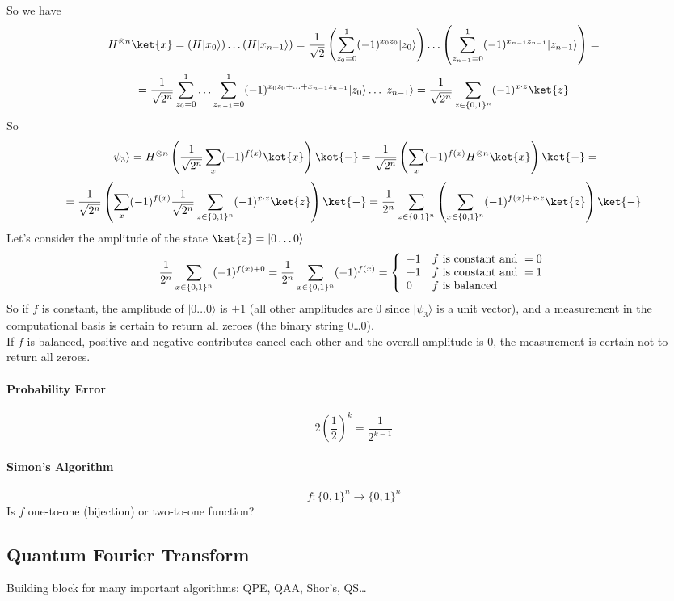 \documentclass[10pt]{report}
\begin{document}
So we have
$$H^{\otimes n}\ket{x} = (H|x_0\rangle)\ldots(H|x_{n-1}\rangle) = \frac{1}{\sqrt{2}}\left(\sum_{z_0=0}^1(-1)^{x_0z_0}|z_0\rangle\right)\ldots\left(\sum_{z_{n-1}=0}^1(-1)^{x_{n-1}z_{n-1}}|z_{n-1}\rangle\right)=$$
$$=\frac{1}{\sqrt{2^n}} \sum_{z_0=0}^1\ldots\sum_{z_{n-1}=0}^1 (-1)^{x_0z_0+\ldots+x_{n-1}z_{n-1}}|z_0\rangle\ldots|z_{n-1}\rangle = \frac{1}{\sqrt{2^n}}\sum_{z\in\{0,1\}^n} (-1)^{x\cdot z}\ket{z}$$
So
$$|\psi_3\rangle = H^{\otimes n}\left(\frac{1}{\sqrt{2^n}}\sum_x(-1)^{f(x)}\ket{x} \right)\ket{-} = \frac{1}{\sqrt{2^n}}\left(\sum_x (-1)^{f(x)}H^{\otimes n}\ket{x}\right)\ket{-} =$$ $$= \frac{1}{\sqrt{2^n}}\left( \sum_x (-1)^{f(x)}\frac{1}{\sqrt{2^n}}\sum_{z\in\{0,1\}^n}(-1)^{x\cdot z}\ket{z}\right)\ket{-} = \frac{1}{2^n}\sum_{z\in\{0,1\}^n}\left(\sum_{x\in\{0,1\}^n}(-1)^{f(x)+x\cdot z}\ket{z}\right)\ket{-}$$
Let's consider the amplitude of the state $\ket{z} = |0\ldots 0\rangle$
$$\frac{1}{2^n}\sum_{x\in\{0,1\}^n}(-1)^{f(x)+0} = \frac{1}{2^n}\sum_{x\in\{0,1\}^n}(-1)^{f(x)}=\left\{\begin{array}{l l}
-1&f\hbox{ is constant and }=0\\
+1&f\hbox{ is constant and }=1\\
0&f\hbox{ is balanced}\\
\end{array}\right.$$
So if $f$ is constant, the amplitude of $|0\ldots0\rangle$ is $\pm 1$ (all other amplitudes are 0 since $|\psi_3\rangle$ is a unit vector), and a measurement in the computational basis is certain to return all zeroes (the binary string 0\ldots 0).\\
If $f$ is balanced, positive and negative contributes cancel each other and the overall amplitude is 0, the measurement is certain not to return all zeroes.
\paragraph{Probability Error} $$2\left(\frac{1}{2}\right)^k = \frac{1}{2^{k-1}}$$
\paragraph{Simon's Algorithm} $$f:\{0,1\}^n\rightarrow\{0,1\}^n$$
Is $f$ one-to-one (bijection) or two-to-one function?
\subsection{Quantum Fourier Transform}
Building block for many important algorithms: QPE, QAA, Shor's, QS\ldots
\end{document}
